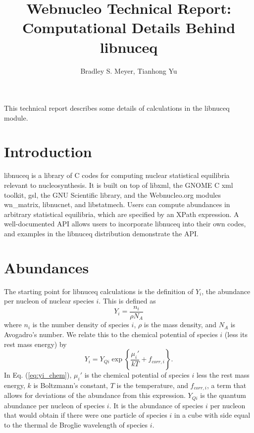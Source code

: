 \documentclass{article}    %
\title{Webnucleo Technical Report: Computational Details Behind libnuceq}  %
\author{Bradley S. Meyer, Tianhong Yu}
\begin{document}

\maketitle                 %


This technical report describes some details of calculations in the
libnuceq module.

\section{Introduction}

libnuceq is a library of C codes for computing nuclear statistical
equilibria relevant to nucleosynthesis.
It is built on top of libxml, the GNOME C xml toolkit, gsl,
the GNU Scientific library, and the Webnucleo.org modules wn\_matrix, libnucnet,
and libstatmech.
Users can compute abundances in arbitrary statistical equilibria, which
are specified by an XPath expression.
A well-documented API allows users to incorporate libnuceq into their
own codes, and examples in the libnuceq distribution demonstrate the API.

\section{Abundances}

The starting point for libnuceq calculations is the definition of $Y_i$, the
abundance per nucleon of nuclear species $i$.  This is defined as
\begin{equation}
Y_i = \frac{n_i}{\rho N_A}
\label{eq:yi}
\end{equation}
where $n_i$ is the number density of species $i$, $\rho$ is the mass density,
and $N_A$ is Avogadro's number.  We relate this to the chemical potential
of species $i$ (less its rest mass energy) by
\begin{equation}
Y_i = Y_{Qi} \exp\left\{\frac{\mu_i'}{kT} + f_{corr,i}\right\}.
\label{eq:yi_chem}
\end{equation}
In Eq. (\ref{eq:yi_chem}), $\mu_i'$ is the chemical potential of species
$i$ less the rest mass energy, $k$ is Boltzmann's constant, $T$ is the
temperature, and $f_{corr,i}$, a term that allows for deviations of the
abundance from this expression.
$Y_{Qi}$ is the quantum abundance per nucleon of species $i$.  It is the
abundance of species $i$ per nucleon that would obtain if there were one
particle of species $i$ in a cube with side equal to the thermal de Broglie
wavelength of species $i$.
\end{document}
